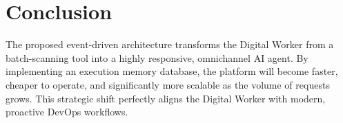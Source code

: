 \documentclass[12pt,a4paper]{article}
\begin{document}
\section{Conclusion}
The proposed event-driven architecture transforms the Digital Worker from a batch-scanning tool into a highly responsive, omnichannel AI agent. By implementing an execution memory database, the platform will become faster, cheaper to operate, and significantly more scalable as the volume of requests grows. This strategic shift perfectly aligns the Digital Worker with modern, proactive DevOps workflows.
\end{document}

